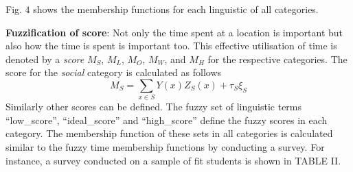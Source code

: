 \documentclass[conference]{IEEEtran}
\newcommand{\quotes}[1]{``#1''}
\begin{document}
Fig. $4$ shows the membership functions for each linguistic of all categories.

\textbf{Fuzzification of score}: Not only the time spent at a location is important but also how the time is spent is important too. This effective utilisation of time is denoted by a \textit{score} $M_S$, $M_L$, $M_O$, $M_W$, and $M_H$ for the respective categories. The score for the \textit{social} category is calculated as follows
\[
M_S = \sum_{x \in S} Y(x)Z_S(x) + \tau_S\xi_S
\]
Similarly other scores can be defined. The fuzzy set of linguistic terms \quotes{low\_score}, \quotes{ideal\_score} and \quotes{high\_score} define the fuzzy scores in each category. The membership function of these sets in all categories is calculated similar to the fuzzy time membership functions by conducting a survey. For instance, a survey conducted on a sample of fit students is shown in TABLE II.
\end{document}
